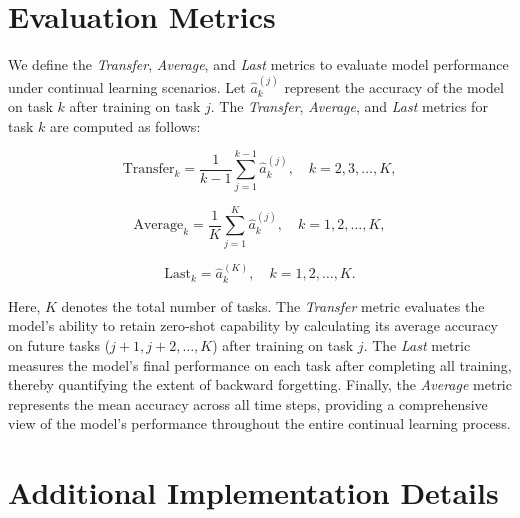 \documentclass{article}
\theoremstyle{plain}
\theoremstyle{definition}
\theoremstyle{remark}
\begin{document}




\newpage
\appendix
\onecolumn


\section{Evaluation Metrics}
\label{sec: evaluation metrics}

We define the \emph{Transfer}, \emph{Average}, and \emph{Last} metrics to evaluate model performance under continual learning scenarios. Let $\hat{a}_{k}^{(j)}$ represent the accuracy of the model on task $k$ after training on task $j$. The \emph{Transfer}, \emph{Average}, and \emph{Last} metrics for task $k$ are computed as follows:

\begin{equation}
\text{Transfer}_{k} = \frac{1}{k - 1} \sum_{j=1}^{k-1} \hat{a}_{k}^{(j)}, \quad k = 2, 3, \dots, K,
\end{equation}

\begin{equation}
\text{Average}_{k} = \frac{1}{K} \sum_{j=1}^{K} \hat{a}_{k}^{(j)}, \quad k = 1, 2, \dots, K,
\end{equation}

\begin{equation}
\text{Last}_{k} = \hat{a}_{k}^{(K)}, \quad k = 1, 2, \dots, K.
\end{equation}

Here, $K$ denotes the total number of tasks. The \emph{Transfer} metric evaluates the model's ability to retain zero-shot capability by calculating its average accuracy on future tasks ($j+1, j+2, \dots, K$) after training on task $j$. The \emph{Last} metric measures the model's final performance on each task after completing all training, thereby quantifying the extent of backward forgetting. Finally, the \emph{Average} metric represents the mean accuracy across all time steps, providing a comprehensive view of the model's performance throughout the entire continual learning process.

\section{Additional Implementation Details}
\label{sec: additional implementation details}
\end{document}
